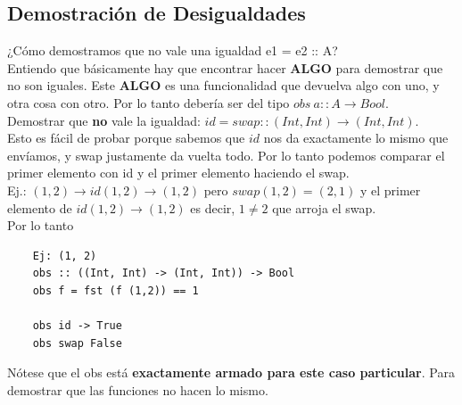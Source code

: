 \documentclass[10pt,a4paper]{article}
\begin{document}
\subsection*{Demostración de Desigualdades}
¿Cómo demostramos que no vale una igualdad e1 = e2 :: A? \\
Entiendo que básicamente hay que encontrar hacer \textbf{ALGO} para demostrar que no son iguales. Este \textbf{ALGO} es una funcionalidad que devuelva algo con uno, y otra cosa con otro. Por lo tanto debería ser del tipo $obs \ a :: A \rightarrow Bool$. \\
Demostrar que \textbf{no} vale la igualdad: $id = swap :: (Int, Int) \rightarrow (Int, Int)$. \\
Esto es fácil de probar porque sabemos que $id$ nos da exactamente lo mismo que envíamos, y swap justamente da vuelta todo. Por lo tanto podemos comparar el primer elemento con id y el primer elemento haciendo el swap. \\
Ej.: $(1, 2) \rightarrow id (1, 2) \rightarrow (1, 2)$ pero $swap (1, 2) = (2, 1)$ y el primer elemento de $id (1, 2) \rightarrow (1, 2)$ es decir, $1 \neq 2$ que arroja el swap. \\
Por lo tanto
\begin{lstlisting}
    Ej: (1, 2)
    obs :: ((Int, Int) -> (Int, Int)) -> Bool 
    obs f = fst (f (1,2)) == 1

    obs id -> True 
    obs swap False
\end{lstlisting}
Nótese que el obs está \textbf{exactamente armado para este caso particular}. Para demostrar que las funciones no hacen lo mismo.
\end{document}
